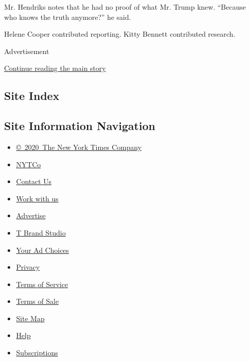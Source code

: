 Mr. Hendriks notes that he had no proof of what Mr. Trump knew.
``Because who knows the truth anymore?'' he said.

Helene Cooper contributed reporting. Kitty Bennett contributed research.

Advertisement

\protect\hyperlink{after-bottom}{Continue reading the main story}

\hypertarget{site-index}{%
\subsection{Site Index}\label{site-index}}

\hypertarget{site-information-navigation}{%
\subsection{Site Information
Navigation}\label{site-information-navigation}}

\begin{itemize}
\tightlist
\item
  \href{https://help.nytimes.com/hc/en-us/articles/115014792127-Copyright-notice}{©~2020~The
  New York Times Company}
\end{itemize}

\begin{itemize}
\tightlist
\item
  \href{https://www.nytco.com/}{NYTCo}
\item
  \href{https://help.nytimes.com/hc/en-us/articles/115015385887-Contact-Us}{Contact
  Us}
\item
  \href{https://www.nytco.com/careers/}{Work with us}
\item
  \href{https://nytmediakit.com/}{Advertise}
\item
  \href{http://www.tbrandstudio.com/}{T Brand Studio}
\item
  \href{https://www.nytimes.com/privacy/cookie-policy\#how-do-i-manage-trackers}{Your
  Ad Choices}
\item
  \href{https://www.nytimes.com/privacy}{Privacy}
\item
  \href{https://help.nytimes.com/hc/en-us/articles/115014893428-Terms-of-service}{Terms
  of Service}
\item
  \href{https://help.nytimes.com/hc/en-us/articles/115014893968-Terms-of-sale}{Terms
  of Sale}
\item
  \href{https://spiderbites.nytimes.com}{Site Map}
\item
  \href{https://help.nytimes.com/hc/en-us}{Help}
\item
  \href{https://www.nytimes.com/subscription?campaignId=37WXW}{Subscriptions}
\end{itemize}
